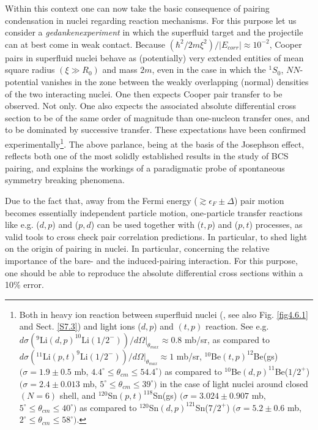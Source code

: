 Within this context one can now take the basic consequence of pairing condensation in nuclei regarding reaction mechanisms. For this purpose let us consider a \textit{gedankenexperiment} in which the superfluid target and the projectile can at best come in  weak contact.  Because $\left(\hbar^2/2m\xi^2\right)/|E_{corr}|\approx10^{-2}$, Cooper pairs in superfluid nuclei behave as (potentially) very extended entities of mean square radius $(\xi\gg R_0)$ and mass $2m$,  even in the case in which the $^1S_0$, $NN$-potential vanishes in the zone between the weakly overlapping (normal) densities of the two interacting nuclei. One then expects Cooper pair transfer to be observed. Not only. One also expects  the associated absolute differential cross section to be of the same order of magnitude than one-nucleon transfer ones,  
 and to be dominated by successive transfer. These expectations have been confirmed experimentally\footnote{\label{f28} Both in heavy ion reaction between superfluid nuclei (\cite{Montanari:14}, see also Fig. \ref{fig4.6.1} and Sect. \ref{S7.3}) and light ions ($d,p$) and $(t,p)$ reaction. See e.g. \cite{Cavallaro:17} $d\sigma(^9\text{Li} (d,p)^{10}\text{Li} (1/2^-))/d\Omega|_{\theta_{max}}\approx0.8$ mb/sr, as compared to \cite{Tanihata:08}  $d\sigma(^{11}\text{Li} (p,t)^{9}\text{Li} (1/2^-))/d\Omega|_{\theta_{max}}\approx1 $ mb/sr, \cite{Fortune:94} $^{10}$Be$(t,p)^{12}$Be(gs) $(\sigma=1.9\pm0.5$ mb, $4.4^\circ\leq\theta_{cm}\leq54.4^\circ)$ as compared to \cite{Schmitt:13} 
 	$^{10}$Be$(d,p)^{11}$Be($1/2^+$) $(\sigma=2.4\pm0.013$ mb, $5^\circ\leq\theta_{cm}\leq39^\circ)$ in the case of light nuclei around closed $(N=6)$ shell, and \cite{Bassani:65} $^{120}$Sn$(p,t)^{118}$Sn(gs) $(\sigma=3.024\pm0.907$ mb, $5^\circ\leq\theta_{cm}\leq40^\circ)$ as compared to \cite{Bechara:75} $^{120}$Sn$(d,p)^{121}$Sn($7/2^+$) $(\sigma=5.2\pm0.6$ mb, $2^\circ\leq\theta_{cm}\leq58^\circ)$. 
 }.
 The above parlance, being at the basis of the Josephson effect, reflects both one of the most solidly established results in the study of BCS pairing, and explains the workings of a paradigmatic probe of spontaneous symmetry breaking phenomena.
 
 
 
Due to the fact that, away from the Fermi energy ($\gtrsim\epsilon_F\pm\Delta$) pair  motion becomes essentially independent particle motion, one-particle transfer reactions like e.g. ($d,p$) and ($p,d$) can be used together with ($t,p$) and ($p,t$) processes, as  valid tools to cross check pair correlation predictions. In particular, to shed light on the origin of pairing in nuclei. In particular, concerning the relative importance of the bare- and the induced-pairing interaction.  For this purpose, one should be able to reproduce the absolute differential cross sections within a 10\% error. 

